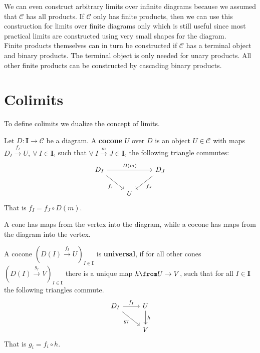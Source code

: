 \begin{remark}
  We can even construct arbitrary limits over infinite diagrams
  because we assumed that $\mathscr C$ has all products.
  If $\mathscr C$ only has finite products, then we can
  use this construction for
  limits over finite diagrams only which is still useful since
  most practical limits are constructed using very small shapes for the diagram.\\
  Finite products themselves can in turn be constructed if $\mathscr C$
  has a terminal object and binary products. The terminal object is
  only needed for unary products. All other finite products
  can be constructed by cascading binary products.
\end{remark}


\chapter{Colimits}
To define colimits we dualize the concept of limits.
\begin{definition}
  Let $D : \bm I \to \mathscr C$ be a diagram.
  A \textbf{cocone} $U$ over $D$ is an object $U \in \mathscr{C}$
  with maps $D_I \overset{ f_I}{\rightarrow} U,\ \forall\ I \in \bm{I}$, such that
  $\forall\ I \overset{m}{\to} J \in \bm{I}$, the following triangle commutes:
  \[
    \begin{tikzcd}
      D_I \arrow[rr, "D(m)"]\arrow[dr, swap, "f_I"] & & D_J \arrow{dl}{f_J}\\
      & U  &
    \end{tikzcd}
  \]
  That is $f_I = f_J \circ D(m)$.\\
\end{definition}
A cone has maps from the vertex into the diagram,
while a cocone has maps from the diagram into the vertex.
\begin{definition}
  A cocone $(D(I)\overset{f_I}{\to} U)_{I\in \bm{I}}$ is \textbf{universal}, if
  for all other cones $(D(I) \overset{g_I}{\to} V)_{I\in \bm{I}}$ there is a unique
  map $h \from U \to V$, such that for all $I \in \bm{I}$
  the following triangles commute.
  \[
    \begin{tikzcd}
      D_I \arrow[dr, swap, "g_I"] \arrow{r}{f_I} & U \arrow{d}{h} \\
      & V
    \end{tikzcd}
  \]
  That is $g_i = f_i \circ h$.
\end{definition}

